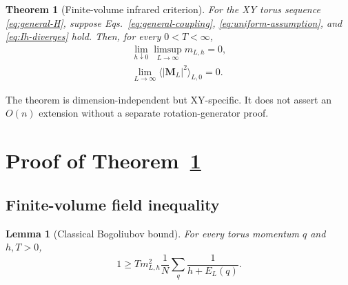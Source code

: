\documentclass[aps,prb,twocolumn,groupedaddress,amsmath,amssymb,
               superscriptaddress,nofootinbib,floatfix]{revtex4-2}
\theoremstyle{plain}
\newtheorem{theorem}{Theorem}
\newtheorem{lemma}{Lemma}
\theoremstyle{definition}
\begin{document}
\begin{theorem}[Finite-volume infrared criterion]
\label{thm:general}
For the XY torus sequence \eqref{eq:general-H}, suppose
Eqs.~\eqref{eq:general-coupling}, \eqref{eq:uniform-assumption}, and
\eqref{eq:Ih-diverges} hold.  Then, for every $0<T<\infty$,
\begin{align}
 \boxed{\displaystyle
 \lim_{h\downarrow0}\limsup_{L\to\infty}m_{L,h}=0,}
\label{eq:general-field-result}\\
 \boxed{\displaystyle
 \lim_{L\to\infty}
 \langle|\bm M_L|^2\rangle_{L,0}=0.}
\label{eq:general-zero-result}
\end{align}
\end{theorem}

The theorem is dimension-independent but XY-specific.  It does not assert
an $O(n)$ extension without a separate rotation-generator proof.

\section{Proof of Theorem~\ref{thm:general}}

\subsection{Finite-volume field inequality}

\begin{lemma}[Classical Bogoliubov bound]
\label{lem:bog}
For every torus momentum $q$ and $h,T>0$,
\begin{equation}
 \boxed{\displaystyle
 1\ge
 Tm_{L,h}^2
 \frac1N\sum_q\frac1{h+E_L(q)}.}
\label{eq:bog}
\end{equation}
\end{lemma}
\end{document}
